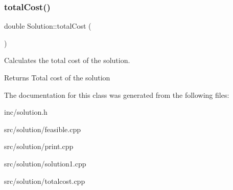 \subsubsection{\texorpdfstring{total\+Cost()}{totalCost()}}
{\footnotesize\ttfamily double Solution\+::total\+Cost (\begin{DoxyParamCaption}{ }\end{DoxyParamCaption})}



Calculates the total cost of the solution. 

\begin{DoxyReturn}{Returns}
Total cost of the solution 
\end{DoxyReturn}


The documentation for this class was generated from the following files\+:\begin{DoxyCompactItemize}
\item 
inc/solution.\+h\item 
src/solution/feasible.\+cpp\item 
src/solution/print.\+cpp\item 
src/solution/solution1.\+cpp\item 
src/solution/totalcost.\+cpp\end{DoxyCompactItemize}
